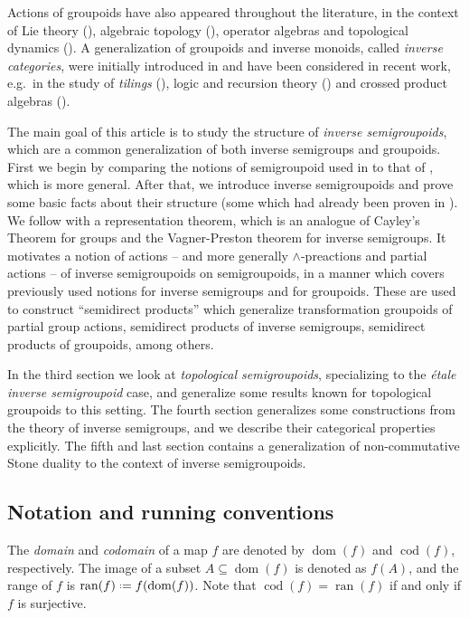 \documentclass[a4paper]{amsart}
\theoremstyle{plain}    \newtheorem{theorem}[generalnumbering]{Theorem}
\theoremstyle{plain}    \newtheorem{corollary}[generalnumbering]{Corollary}
\theoremstyle{definition}   \newtheorem{definition}[generalnumbering]{Definition}
\theoremstyle{definition}   \newtheorem{example}[generalnumbering]{Example}
\theoremstyle{plain}    \newtheorem{proposition}[generalnumbering]{Proposition}
\theoremstyle{plain}    \newtheorem{lemma}[generalnumbering]{Lemma}
\theoremstyle{plain}    \newtheorem{plainstyle}[generalnumbering]{\namefordifferentenvironment}
\theoremstyle{plain}    \newtheorem*{plainstyle*}{\namefordifferentenvironment}
\theoremstyle{definition}    \newtheorem{definitionstyle}[generalnumbering]{\namefordifferentenvironment}
\theoremstyle{definition}    \newtheorem*{definitionstyle*}{\namefordifferentenvironment}
\DeclareMathOperator{\dom}{dom}
\DeclareMathOperator{\ran}{ran}
\DeclareMathOperator{\cod}{cod}
\newcommand*{\defeq}{\mathrel{\vcenter{\baselineskip0.5ex \lineskiplimit0pt\hbox{\scriptsize.}\hbox{\scriptsize.}}}=}
\begin{document}
Actions of groupoids have also appeared throughout the literature, in the context of Lie theory (\cite{MR2012261}), algebraic topology (\cite{MR2273730}), operator algebras and topological dynamics (\cite{MR2982887,MR2969047,MR2941279}). A generalization of groupoids and inverse monoids, called \emph{inverse categories}, were initially introduced in \cite{MR0506554} and have been considered in recent work, e.g.\ in the study of \emph{tilings} (\cite{MR1736698}), logic and recursion theory (\cite{MR1871071,MR3605681}) and crossed product algebras (\cite{MR2959793}).

The main goal of this article is to study the structure of \emph{inverse semigroupoids}, which are a common generalization of both inverse semigroups and groupoids. First we begin by comparing the notions of semigroupoid used in \cite{MR3597709,MR915990} to that of \cite{MR2754831}, which is more general. After that, we introduce inverse semigroupoids and prove some basic facts about their structure (some which had already been proven in \cite{MR3597709}). We follow with a representation theorem, which is an analogue of Cayley's Theorem for groups and the Vagner-Preston theorem for inverse semigroups. It motivates a notion of actions -- and more generally $\land$-preactions and partial actions -- of inverse semigroupoids on semigroupoids, in a manner which covers previously used notions for inverse semigroups and for groupoids. These are used to construct ``semidirect products'' which generalize transformation groupoids of partial group actions, semidirect products of inverse semigroups, semidirect products of groupoids, among others.

In the third section we look at \emph{topological semigroupoids}, specializing to the \emph{étale inverse semigroupoid} case, and generalize some results known for topological groupoids to this setting. The fourth section generalizes some constructions from the theory of inverse semigroups, and we describe their categorical properties explicitly. The fifth and last section contains a generalization of non-commutative Stone duality to the context of inverse semigroupoids.

\subsection*{Notation and running conventions}

The \emph{domain} and \emph{codomain} of a map $f$ are denoted by $\dom(f)$ and $\cod(f)$, respectively. The image of a subset $A\subseteq\dom(f)$ is denoted as $f(A)$, and the range of $f$ is $\ran(f)\defeq f(\dom(f))$. Note that $\cod(f)=\ran(f)$ if and only if $f$ is surjective.
\end{document}
